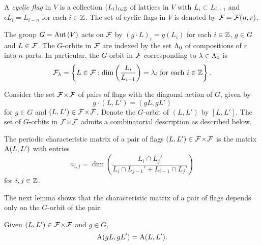 \documentclass[a4paper, 11pt, twoside]{report}
\begin{document}
\begin{definition}\label{definition:cyclic-flags}
A \emph{cyclic flag} in $V$ is a collection $(L_i)_{i\in\mathbb{Z}}$ of lattices in $V$ with $L_i\subset L_{i+1}$ and $\epsilon L_i = L_{i-n}$ for each $i\in\mathbb{Z}$. The set of cyclic flags in $V$ is denoted by $\mathcal{F}=\mathcal{F}(n,r)$.
\end{definition}

The group $G=\operatorname{Aut}{(V)}$ acts on $\mathcal{F}$ by $(g\cdot L)_i = g(L_i)$ for each $i\in\mathbb{Z}$, $g\in G$ and $L\in\mathcal{F}$. The $G$-orbits in $\mathcal{F}$ are indexed by the set $\Lambda_0{}$ of compositions of $r$ into $n$ parts. In particular, the $G$-orbit in $\mathcal{F}$ corresponding to $\lambda\in\Lambda_0{}$ is
\begin{equation*}
\mathcal{F}_\lambda = \left\{L\in\mathcal{F}: \dim\left(\frac{L_i}{L_{i-1}}\right) = \lambda_i \text{ for each } i\in\mathbb{Z}\right\}.
\end{equation*}

Consider the set ${\mathcal{F}\!\times\!\mathcal{F}}$ of pairs of flags with the diagonal action of $G$, given by
\begin{equation*}
g\cdot(L,L') = (gL,gL')
\end{equation*}
for $g\in G$ and $(L,L')\in{\mathcal{F}\!\times\!\mathcal{F}}$. Denote the $G$-orbit of $(L,L')$ by $[L,L']$. The set of $G$-orbits in ${\mathcal{F}\!\times\!\mathcal{F}}$ admits a combinatorial description as described below.

\begin{definition}\label{def:characteristic-matrix}
The periodic characteristic matrix of a pair of flags $(L,L')\in{\mathcal{F}\!\times\!\mathcal{F}}$ is the matrix $\operatorname{A}(L,L')$ with entries
\begin{equation*}
a_{i,j} = \dim\left(\frac{L_i\cap L_j'}{L_i\cap L_{j-1}' + L_{i-1}\cap L_j'}\right)
\end{equation*}
for $i,j\in\mathbb{Z}$.
\end{definition}

The next lemma shows that the characteristic matrix of a pair of flags depends only on the $G$-orbit of the pair.

\begin{lemma}
Given $(L,L')\in{\mathcal{F}\!\times\!\mathcal{F}}$ and $g\in G$,
\begin{equation*}
\operatorname{A}(gL,gL') = \operatorname{A}(L,L').
\end{equation*}
\end{lemma}
\end{document}

